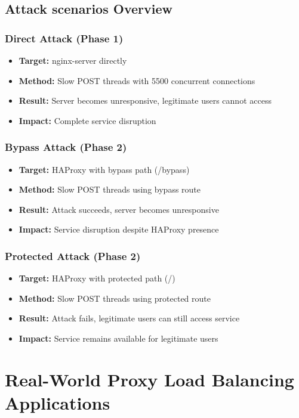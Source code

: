 \documentclass[12pt]{article}
\begin{document}
\subsection{Attack scenarios Overview}

\subsubsection{Direct Attack (Phase 1)}
\begin{itemize}
    \item \textbf{Target:} nginx-server directly
    \item \textbf{Method:} Slow POST threads with 5500 concurrent connections
    \item \textbf{Result:} Server becomes unresponsive, legitimate users cannot access
    \item \textbf{Impact:} Complete service disruption
\end{itemize}

\subsubsection{Bypass Attack (Phase 2)}
\begin{itemize}
    \item \textbf{Target:} HAProxy with bypass path (/bypass)
    \item \textbf{Method:} Slow POST threads using bypass route
    \item \textbf{Result:} Attack succeeds, server becomes unresponsive
    \item \textbf{Impact:} Service disruption despite HAProxy presence
\end{itemize}

\subsubsection{Protected Attack (Phase 2)}
\begin{itemize}
    \item \textbf{Target:} HAProxy with protected path (/)
    \item \textbf{Method:} Slow POST threads using protected route
    \item \textbf{Result:} Attack fails, legitimate users can still access service
    \item \textbf{Impact:} Service remains available for legitimate users
\end{itemize}

\section{Real-World Proxy Load Balancing Applications}
\end{document}
